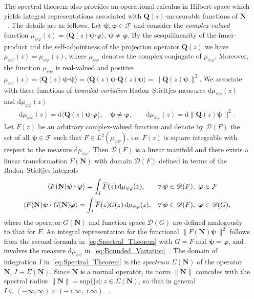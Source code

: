 \documentclass[leqno,onefignum,onetabnum]{siamltex1213}
\renewcommand{\d}{\mathrm{d}}
\newcommand{\Qb}{\mathbf{Q}}
\newcommand{\Nb}{\mathbf{N}}
\newcommand{\Fc}{\mathcal{F}}
\providecommand\bcdot{\boldsymbol{\cdot}}
\newcommand{\vecpsi}{\boldsymbol{\psi}}
\newcommand{\vecvarphi}{\boldsymbol{\varphi}}
\begin{document}
The spectral theorem also provides an operational calculus in Hilbert
space which yields integral representations associated with
$\Qb(z)$-measurable functions of $\Nb$~\cite{Stone:64}. The details
are as follows. Let $\vecpsi,\vecvarphi\in\Fc$ and consider the
\emph{complex-valued} function $\mu_{\psi\varphi}(z)=\langle\Qb(z)\vecpsi\bcdot\vecvarphi\rangle$,
$\vecpsi\neq\vecvarphi$. By the sesquilinearity of the inner-product and the
self-adjointness of the projection operator $\Qb(z)$ we have
$\mu_{\varphi\psi}(z)=\overline{\mu}_{\psi\varphi}(z)$, where $\overline{\mu}_{\psi\varphi}$ denotes
the complex conjugate of $\mu_{\psi\varphi}$. Moreover, the function $\mu_{\psi\psi}$ is
real-valued and positive
$\mu_{\psi\psi}(z)=\langle\Qb(z)\vecpsi\bcdot\vecpsi\rangle=\langle\Qb(z)\vecpsi\bcdot\Qb(z)\vecpsi\rangle
=\|\Qb(z)\vecpsi\,\|^2$. We associate with these functions of
\emph{bounded variation} Radon--Stieltjes measures $\d\mu_{\psi\varphi}(z)$ and
$\d\mu_{\psi\psi}(z)$~\cite{Stone:64}   
%
\begin{align}%
  \d\mu_{\psi\varphi}(z)=\d\langle\Qb(z)\vecpsi\bcdot\vecvarphi\rangle, \quad
  \vecpsi\neq\vecvarphi, \qquad
  \d\mu_{\psi\psi}(z)=\d\|\Qb(z)\vecpsi\,\|^2.
\end{align} 
%
Let $F(z)$ be an arbitrary complex-valued function and denote by
$\mathscr{D}(F)$ the set of all $\vecpsi\in\Fc$ such that
$F\in L^2(\mu_{\psi\psi})$, i.e. $F(z)$ is square integrable with respect to the
measure $\d\mu_{\psi\psi}$. 
Then $\mathscr{D}(F)$ is a linear manifold and there exists a linear
transformation $F(\Nb)$ with domain $\mathscr{D}(F)$ defined in terms
of the Radon--Stieltjes integrals~\cite{Stone:64} 
%
\begin{align}%
  \langle F(\Nb)\vecpsi\bcdot\vecvarphi\rangle=\int_I\overline{F}(z)\,\d\mu_{\psi\varphi}(z), \qquad
  &\forall \, \vecpsi\in\mathscr{D}(F), \ \vecvarphi\in\Fc
  \\
  \langle F(\Nb)\vecpsi\bcdot G(\Nb)\vecvarphi\rangle=\int_I\overline{F}(z)G(z)\,\d\mu_{\psi\varphi}(z),
  \quad
  &\forall \, \vecpsi\in\mathscr{D}(F), \ \vecvarphi\in\mathscr{D}(G),
  \notag
\end{align}
%
where the operator $G(\Nb)$ and function space $\mathscr{D}(G)$ are
defined analogously to that for $F$. An integral representation for
the functional $\|F(\Nb)\vecpsi\,\|^2$ follows from the second formula
in~\eqref{eq:Spectral_Theorem} with $G=F$ and $\vecpsi=\vecvarphi$, and
involves the measure $\d\mu_{\psi\psi}$
in~\eqref{eq:Bounded_Variation}~\cite{Stone:64}.  The domain of
integration $I$ 
in~\eqref{eq:Spectral_Theorem} is the \emph{spectrum} $\Sigma(\Nb)$ of the 
operator $\Nb$, $I\equiv\Sigma(\Nb)$. Since $\Nb$ is a normal operator, its norm 
$\|\Nb\|$ coincides with the spectral radius
$\|\Nb\|=\text{sup}\{|z|: z\in\Sigma(\Nb)$, so that in general
$I\subseteq(-\infty,\infty)\times(-\imath\infty,\imath\infty)$ ~\cite{Reed-1980,Stone:64}.  
\end{document}
